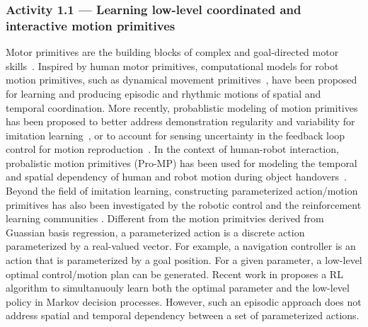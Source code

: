 \documentclass[letterpaper, 11 pt, onecolumn]{article}
\begin{document}

\subsubsection{Activity 1.1 --- Learning low-level coordinated and interactive motion primitives}\label{sec:plan-motion-low}

Motor primitives are the building blocks of complex and goal-directed motor skills~\cite{flash2005motor}. Inspired by human motor primitives, computational models for robot motion primitives, such as dynamical movement primitives~\cite{ijspeert2013dynamical}, have been proposed for learning and producing episodic and rhythmic motions of spatial and temporal coordination. More recently, probablistic modeling of motion primitives has been proposed to better address demonstration regularity and variability for imitation learning~\cite{calinon2007learning,calinon2010learning}, or to account for sensing uncertainty in the feedback loop control for motion reproduction~\cite{meier2016probabilistic}. In the context of human-robot interaction, probalistic motion primitives (Pro-MP) has been used for modeling the temporal and spatial dependency of human and robot motion during object handovers~\cite{maeda2017phase}. Beyond the field of imitation learning, constructing parameterized action/motion primitives has also been investigated by the robotic control \cite{fu2013bottom} and the reinforcement learning communities \cite{masson2016reinforcement}. Different from the motion primitvies derived from Guassian basis regression, a parameterized action is a discrete action parameterized by a real-valued vector. For example, a navigation controller is an action that is parameterized by a goal position. For a given parameter, a low-level optimal control/motion plan can be generated. Recent work in \cite{masson2016reinforcement} proposes a RL algorithm to simultanuouly learn both the optimal parameter and the low-level policy in Markov decision processes. However, such an episodic approach does not address spatial and temporal dependency between a set of parameterized actions. 
\end{document}
